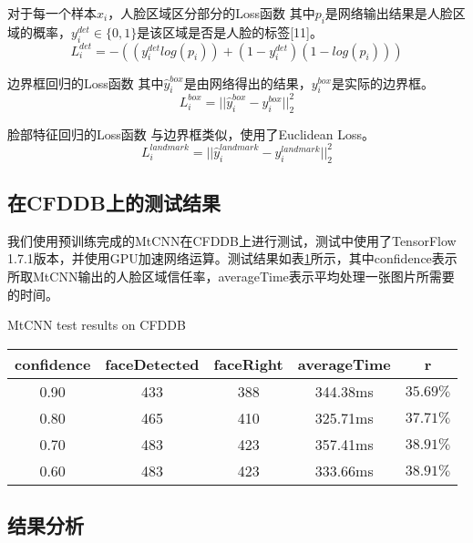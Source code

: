 对于每一个样本$x_i$，人脸区域区分部分的Loss函数 其中$p_i$是网络输出结果是人脸区域的概率，$y_i^{det}\in\{0,1\}$是该区域是否是人脸的标签[11]。
\begin{displaymath}
	L_{i}^{det}=-((y_{i}^{det}log(p_{i}))+(1-y_{i}^{det})(1-log(p_i)))
\end{displaymath}



边界框回归的Loss函数 其中$\hat{y}_i^{box}$是由网络得出的结果，$y_i^{box}$是实际的边界框。
\begin{displaymath}
	L_{i}^{box}=||{\hat{y}_i^{box}-y_i^{box}}||_2^2
\end{displaymath}



脸部特征回归的Loss函数 与边界框类似，使用了Euclidean Loss。
\begin{displaymath}
L_{i}^{landmark}=||{\hat{y}_i^{landmark}-y_i^{landmark}}||_2^2
\end{displaymath}



\subsection{在CFDDB上的测试结果}

我们使用预训练完成的MtCNN在CFDDB上进行测试，测试中使用了TensorFlow 1.7.1版本，并使用GPU加速网络运算。测试结果如表\ref{tab:mtcnn}所示，其中confidence表示所取MtCNN输出的人脸区域信任率，averageTime表示平均处理一张图片所需要的时间。

\begin{table}[!hpb]
	\centering
	{MtCNN test results on CFDDB}
	\label{tab:mtcnn}
	\begin{tabular}{ cccc | c }
		\hline
		confidence & faceDetected & faceRight & averageTime & r\\
		\hline
		0.90 & 433 & 388 & 344.38ms & $35.69\%$\\
		0.80 & 465 & 410 & 325.71ms & $37.71\%$\\
		0.70 & 483 & 423 & 357.41ms & $38.91\%$\\
		0.60 & 483 & 423 & 333.66ms & $38.91\%$\\
		\hline
	\end{tabular}
\end{table}

\subsection{结果分析}

